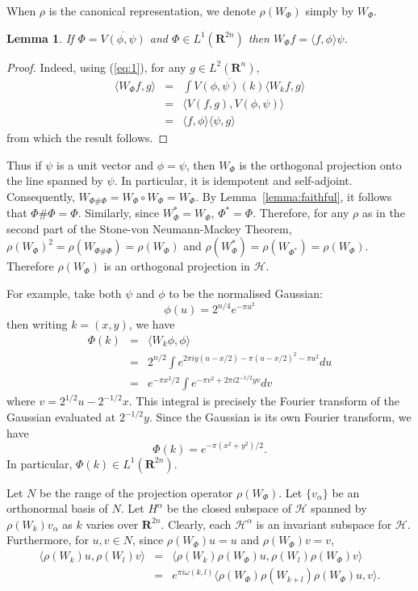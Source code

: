 \documentclass[11pt]{amsart}
\numberwithin{equation}{section}
\theoremstyle{plain}
\newtheorem{lemma}[theorem]{Lemma}
\theoremstyle{definition}
\newcommand{\Hilb}{\mathcal H}
\newcommand{\R}{\mathbf R}
\begin{document}
When $\rho$ is the canonical representation, we denote $\rho(W_\Phi)$ simply by $W_\Phi$.
\begin{lemma}
  \label{lemma:projection}
  If $\Phi=\overline{V(\phi,\psi)}$ and $\Phi\in L^1(\R^{2n})$ then $W_\Phi f = \langle f,\phi\rangle \psi$.
\end{lemma}
\begin{proof}
  Indeed, using (\ref{eq:1}), for any $g\in L^2(\R^n)$,
  \begin{eqnarray*}
    \langle W_\Phi f, g\rangle & = &  \int \overline{V(\phi,\psi)(k)} \langle W_k f, g\rangle\\
    & = & \langle V(f,g),V(\phi,\psi)\rangle\\
    & = & \langle f, \phi \rangle \langle \psi, g\rangle
  \end{eqnarray*}
  from which the result follows.
\end{proof}
Thus if $\psi$ is a unit vector and $\phi=\psi$, then $W_\Phi$ is the orthogonal projection onto the line spanned by $\psi$.
In particular, it is idempotent and self-adjoint.
Consequently, $W_{\Phi\#\Phi}=W_\Phi\circ W_\Phi=W_\Phi$.
By Lemma~\ref{lemma:faithful}, it follows that $\Phi\#\Phi=\Phi$.
Similarly, since $W_\Phi^*=W_\Phi$, $\Phi^*=\Phi$.
Therefore, for any $\rho$ as in the second part of the Stone-von Neumann-Mackey Theorem, $\rho(W_\Phi)^2=\rho(W_{\Phi\#\Phi})=\rho(W_\Phi)$ and $\rho(W_\Phi^*)=\rho(W_{\Phi^*})=\rho(W_\Phi)$.
Therefore $\rho(W_\Phi)$ is an orthogonal projection in $\Hilb$.

For example, take both $\psi$ and $\phi$ to be the normalised Gaussian:
\begin{equation*}
  \phi(u)=2^{n/4}e^{-\pi u^2}
\end{equation*}
then writing $k=(x,y)$, we have
\begin{eqnarray*}
  \Phi(k) & = & \langle W_k \phi,\phi \rangle\\
  & = & 2^{n/2} \int e^{2\pi i y(u-x/2)-\pi (u-x/2)^2-\pi u^2}d u\\
  & = & e^{-\pi x^2/2}\int e^{-\pi v^2+2\pi i2^{-1/2}y v}d v
\end{eqnarray*}
where $v=2^{1/2}u-2^{-1/2}x$.
This integral is precisely the Fourier transform of the Gaussian evaluated at $2^{-1/2}y$.
Since the Gaussian is its own Fourier transform, we have
\begin{equation*}
  \Phi(k)=e^{-\pi(x^2+y^2)/2}.
\end{equation*}
In particular, $\Phi(k)\in L^1(\R^{2n})$.

Let $N$ be the range of the projection operator $\rho(W_\Phi)$.
Let $\{v_\alpha\}$ be an orthonormal basis of $N$.
Let $H^\alpha$ be the closed subspace of $\Hilb$ spanned by $\rho(W_k)v_\alpha$ as $k$ varies over $\R^{2n}$.
Clearly, each $\Hilb^\alpha$ is an invariant subspace for $\Hilb$.
Furthermore, for $u,v\in N$, since $\rho(W_\Phi)u=u$ and $\rho(W_\Phi)v=v$,
\begin{eqnarray*}
  \langle \rho(W_k)u, \rho(W_l)v\rangle & = & \langle \rho(W_k)\rho(W_\Phi)u, \rho(W_l)\rho(W_\Phi)v\rangle\\
  & = & e^{\pi i\omega(k,l)}\langle \rho(W_\Phi)\rho(W_{k+l})\rho(W_\Phi)u,v\rangle.
\end{eqnarray*}
\end{document}
